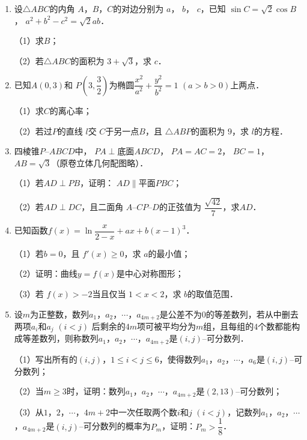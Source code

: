\documentclass[UTF8,a4paper]{ctexart}
\begin{document}
\begin{enumerate}[series=s3, leftmargin=2em, itemsep=0.8em]


\item
设$\triangle ABC$的内角 $A$，$B$，$C$的对边分别为 $a$， $b$， $c$，已知 $\sin C=\sqrt 2\cos B$， $a^2+b^2-c^2=\sqrt 2 ab$．

（1）求$B$；

（2）若$\triangle ABC$的面积为 $3+\sqrt 3$，求 $c$．





\item
已知$A(0,3)$和 $P\left(3,\dfrac{3}{2}\right)$为椭圆$\dfrac{x^2}{a^2}+\dfrac{y^2}{b^2}=1$ $(a>b>0)$上两点．

（1）求$C$的离心率；

（2）若过$P$的直线 $l$交 $C$于另一点$B$，且 $\triangle ABP$的面积为 $9$，求 $l$的方程．





\item
四棱锥$P$--$ABCD$中， $PA\perp$底面$ABCD$， $PA=AC=2$， $BC=1$， $AB=\sqrt{3}$（原卷立体几何配图略）．

（1）若$AD\perp PB$，证明： $AD\parallel$平面$PBC$；

（2）若$AD\perp DC$，且二面角 $A$--$CP$--$D$的正弦值为 $\dfrac{\sqrt{42}}{7}$，求$AD$．





\item
已知函数$f(x)=\ln \dfrac{x}{2-x}+ax+b\left(x-1\right)^3$．

（1）若$b=0$，且 $f'(x)\geqslant 0$，求 $a$的最小值；

（2）证明：曲线$y=f(x)$是中心对称图形；

（3）若 $f(x)>-2$当且仅当 $1<x<2$，求 $b$的取值范围．





\item
设$m$为正整数，数列$a_1$，$a_2$，$\cdots$，$a_{4m+2}$是公差不为$0$的等差数列，若从中删去两项$a_i$和$a_j$ $(i<j)$ 后剩余的$4m$项可被平均分为$m$组，且每组的$4$个数都能构成等差数列，则称数列$a_1$，$a_2$，$\cdots$，$a_{4m+2}$是$(i,j)$--可分数列．

（1）写出所有的$(i,j)$，$1\leqslant i<j\leqslant 6$，使得数列$a_1$，$a_2$，$\cdots$，$a_{6}$是$(i,j)$--可分数列；

（2）当$m\geqslant 3$时，证明：数列$a_1$，$a_2$，$\cdots$，$a_{4m+2}$是$(2,13)$--可分数列；

（3）从$1$，$2$，$\cdots$，$4m+2$中一次任取两个数$i$和$j$ $(i<j)$，记数列$a_1$，$a_2$，$\cdots$，$a_{4m+2}$是$(i,j)$--可分数列的概率为$P_m$，证明：$P_m>\dfrac{1}{8}$．




\end{enumerate}
\vspace{1em}
\end{document}
